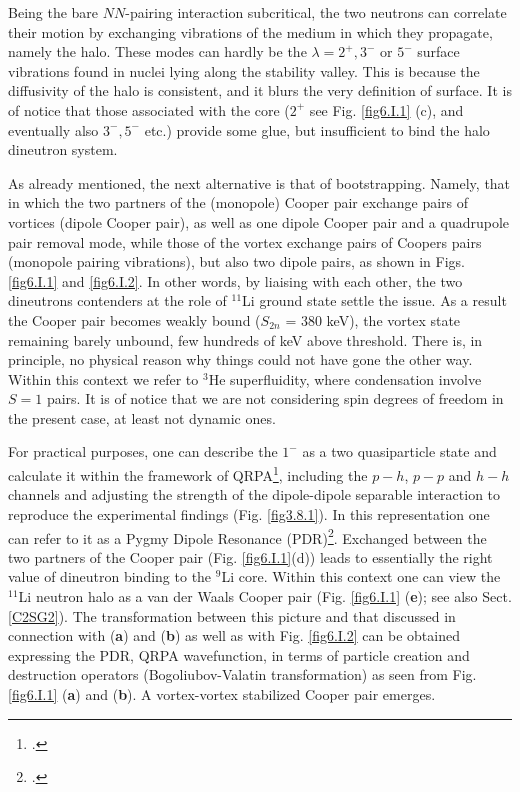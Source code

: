 \begin{subappendices}
Being the bare $NN$-pairing interaction subcritical, the two neutrons can correlate their motion by exchanging vibrations of the medium in which they propagate, namely  the halo.  These modes can hardly  be the $\lambda= 2^+,3^-$ or $5^-$ surface vibrations found in nuclei lying along the  stability valley. This is because the diffusivity of the halo is consistent, and it blurs the very definition of surface. It is of notice that those associated with  the core ($ 2^+$ see Fig. \ref{fig6.I.1} (c), and eventually also $3^-,5^-$ etc.) provide some glue, but insufficient to bind  the  halo dineutron system.

As already mentioned, the next alternative is that of bootstrapping. 
 Namely, that in which the two partners of the  (monopole) Cooper pair exchange  pairs of vortices 
(dipole Cooper pair),  as well as one dipole Cooper pair and a quadrupole pair removal mode,
while those of the vortex exchange  pairs of Coopers pairs (monopole pairing vibrations), but also two dipole pairs, as shown in Figs. \ref{fig6.I.1} and \ref{fig6.I.2}.  In other words, by  liaising  with each other,  
the two dineutrons contenders at the role of $^{11}$Li ground state  settle the issue.  As a result  the Cooper pair becomes weakly bound ($S_{2n}$ = 380 keV), the vortex state remaining barely unbound, few hundreds of keV above threshold.
There is, in principle, no physical reason why things could not have gone  the other way. Within this context we refer to $^3$He superfluidity, where condensation involve $S=1$ pairs. It is of notice that we are not considering spin degrees of freedom in  the present case,
at least  not dynamic ones. 

For practical purposes, one can describe the  $1^-$ as a two quasiparticle state and calculate it within  the framework of QRPA\footnote{\cite{Broglia:19}.},  including the $p-h$, $p-p$ and $h-h$ channels and adjusting the strength of the dipole-dipole separable interaction to reproduce the  experimental findings (Fig. \ref{fig3.8.1}). In this representation one can  refer to it  as a Pygmy Dipole  Resonance (PDR)\footnote{\cite{Barranco:01,Broglia:19c}.}. Exchanged between the  two partners of the Cooper pair (Fig. \ref{fig6.I.1}(d)) leads to essentially the right value of  dineutron binding  to the $^9$Li core. Within this context  one can view the
$^{11}$Li neutron halo as a van der Waals Cooper pair 
 (Fig. \ref{fig6.I.1} (\textbf{e}); see also Sect. \ref{C2SG2}). The transformation between this picture and  that discussed in connection with 
(\textbf{a}) and (\textbf{b}) as well as with Fig. \ref{fig6.I.2} can be obtained  expressing the PDR, QRPA wavefunction, in terms of particle  creation and destruction operators (Bogoliubov-Valatin transformation) as seen from Fig. \ref{fig6.I.1} (\textbf{a}) and (\textbf{b}). 
A vortex-vortex  stabilized Cooper pair emerges. 


\end{subappendices}
